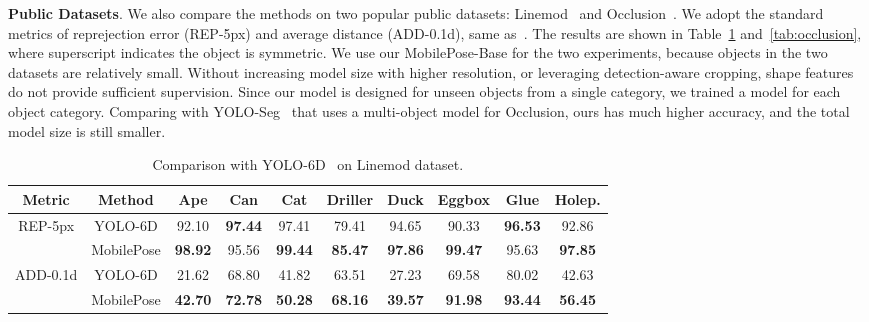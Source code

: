 \documentclass[runningheads]{llncs}
\begin{document}
\textbf{Public Datasets}. We also compare the methods on two popular public datasets: Linemod~\cite{Hinterstoisser_2012_LINEMOD} and Occlusion~\cite{Brachmann_2014_Occlusion}. We adopt the standard metrics of reprejection error (REP-5px) and average distance (ADD-0.1d), same as~\cite{Tekin_2018_SingleShot,Hu_2019_Segmentation}. The results are shown in Table~\ref{tab:linemod} and~\ref{tab:occlusion}, where superscript  indicates the object is symmetric. We use our MobilePose-Base for the two experiments, because objects in the two datasets are relatively small. Without increasing model size with higher resolution, or leveraging detection-aware cropping, shape features do not provide sufficient supervision. Since our model is designed for unseen objects from a single category, we trained a model for each object category. Comparing with YOLO-Seg~\cite{Hu_2019_Segmentation} that uses a multi-object model for Occlusion, ours has much higher accuracy, and the total model size is still smaller.

\begin{table}[t]
\begin{center}
\begin{tabular}{c|c||c|c|c|c|c|c|c|c}\hline
Metric & Method & Ape & Can & Cat & Driller & Duck & Eggbox & Glue & Holep.\\
\hline
\multirow{2}{*}{REP-5px} &
YOLO-6D &  92.10 & \textbf{97.44} & 97.41 & 79.41 & 94.65 & 90.33 & \textbf{96.53} & 92.86 \\
&MobilePose & \textbf{98.92} & 95.56 & \textbf{99.44} & \textbf{85.47} & \textbf{97.86} & \textbf{99.47} & 95.63 & \textbf{97.85}\\
\hline
\multirow{2}{*}{ADD-0.1d} &
YOLO-6D & 21.62 & 68.80 & 41.82 & 63.51 & 27.23 & 69.58 & 80.02 & 42.63 \\
&MobilePose & \textbf{42.70} & \textbf{72.78} & \textbf{50.28} & \textbf{68.16} & \textbf{39.57} & \textbf{91.98} & \textbf{93.44} & \textbf{56.45} \\
\hline
\end{tabular}
\caption{Comparison with YOLO-6D~\cite{Tekin_2018_SingleShot} on Linemod dataset.}
\label{tab:linemod}
\end{center}
\end{table}
\end{document}
